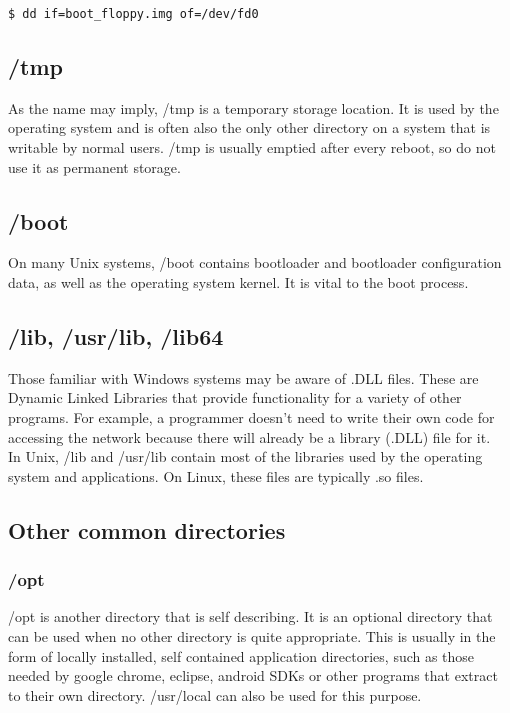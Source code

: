 \begin{verbatim}
$ dd if=boot_floppy.img of=/dev/fd0
\end{verbatim}

\subsection{/tmp}

As the name may imply, /tmp is a temporary storage location.  It is used by the operating system and is often also the only other directory on a system that is writable by normal users.  /tmp is usually emptied after every reboot, so do not use it as permanent storage.

\subsection{/boot}

On many Unix systems, /boot contains bootloader and bootloader configuration data, as well as the operating system kernel.  It is vital to the boot process.

\subsection{/lib, /usr/lib, /lib64}

Those familiar with Windows systems may be aware of .DLL files.  These are Dynamic Linked Libraries that provide functionality for a variety of other programs.  For example, a programmer doesn't need to write their own code for accessing the network because there will already be a library (.DLL) file for it.\\

In Unix, /lib and /usr/lib contain most of the libraries used by the operating system and applications.  On Linux, these files are typically .so files.

\subsection{Other common directories}

\subsubsection{/opt}

/opt is another directory that is self describing.  It is an optional directory that can be used when no other directory is quite appropriate.  This is usually in the form of locally installed, self contained application directories, such as those needed by google chrome, eclipse, android SDKs or other programs that extract to their own directory.  /usr/local can also be used for this purpose.


